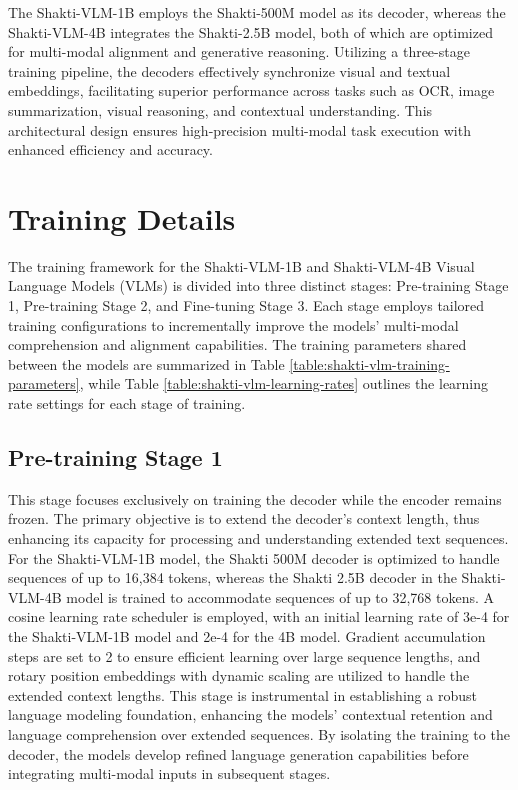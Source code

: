 \documentclass{article}
\begin{document}
The Shakti-VLM-1B employs the Shakti-500M model as its decoder, whereas the Shakti-VLM-4B integrates the Shakti-2.5B\cite{shakhadri2024shakti25billionparameter} model, both of which are optimized for multi-modal alignment and generative reasoning. Utilizing a three-stage training pipeline, the decoders effectively synchronize visual and textual embeddings, facilitating superior performance across tasks such as OCR, image summarization, visual reasoning, and contextual understanding. This architectural design ensures high-precision multi-modal task execution with enhanced efficiency and accuracy. 



\section{Training Details }
The training framework for the Shakti-VLM-1B and Shakti-VLM-4B Visual Language Models (VLMs) is divided into three distinct stages: Pre-training Stage 1, Pre-training Stage 2, and Fine-tuning Stage 3. Each stage employs tailored training configurations to incrementally improve the models’ multi-modal comprehension and alignment capabilities. The training parameters shared between the models are summarized in Table \ref{table:shakti-vlm-training-parameters}, while Table \ref{table:shakti-vlm-learning-rates} outlines the learning rate settings for each stage of training. 

\subsection{Pre-training Stage 1}
 This stage focuses exclusively on training the decoder while the encoder remains frozen. The primary objective is to extend the decoder’s context length, thus enhancing its capacity for processing and understanding extended text sequences. For the Shakti-VLM-1B model, the Shakti 500M decoder is optimized to handle sequences of up to 16,384 tokens, whereas the Shakti 2.5B decoder in the Shakti-VLM-4B model is trained to accommodate sequences of up to 32,768 tokens. A cosine learning rate scheduler is employed, with an initial learning rate of 3e-4 for the Shakti-VLM-1B model and 2e-4 for the 4B model. Gradient accumulation steps are set to 2 to ensure efficient learning over large sequence lengths, and rotary position embeddings with dynamic scaling are utilized to handle the extended context lengths. This stage is instrumental in establishing a robust language modeling foundation, enhancing the models’ contextual retention and language comprehension over extended sequences. By isolating the training to the decoder, the models develop refined language generation capabilities before integrating multi-modal inputs in subsequent stages. 
\end{document}
